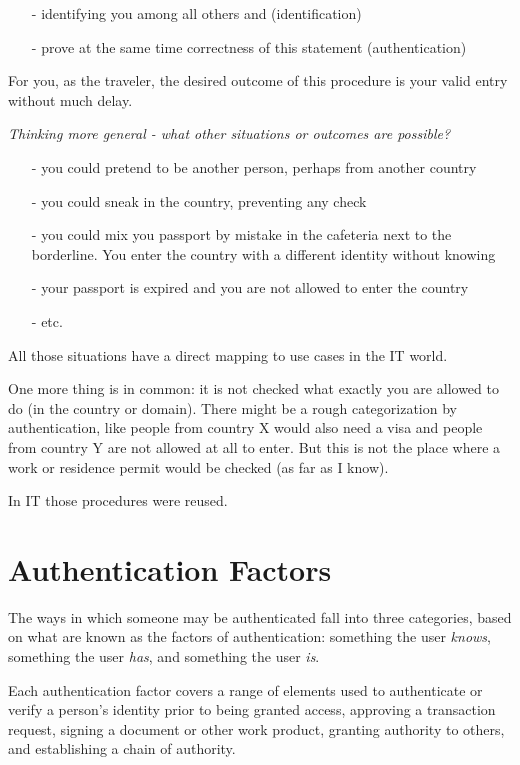 \begin{enumerate}
    \item[-] identifying you among all others and (identification)
    \item[-] prove at the same time correctness of this statement (authentication)
\end{enumerate}

For you, as the traveler, the desired outcome of this procedure is your valid entry without much delay.


\emph{Thinking more general - what other situations or outcomes are possible?}

\begin{itemize}
    \item[-] you could pretend to be another person, perhaps from another country
    \item[-] you could sneak in the country, preventing any check
    \item[-] you could mix you passport by mistake in the cafeteria next to the borderline. 
        You enter the country with a different identity without knowing
    \item[-] your passport is expired and you are not allowed to enter the country
    \item[-] etc.
\end{itemize}

All those situations have a direct mapping to use cases in the IT world.

One more thing is in common: it is not checked what exactly you are allowed to do (in the country or domain). There might be a rough categorization by authentication, like people from country X would also need a visa and people from country Y are not allowed at all to enter. But this is not the place where a work or residence permit would be checked (as far as I know).

In IT those procedures were reused.


\section{Authentication Factors}

The ways in which someone may be authenticated fall into three categories, based on what are known as the factors of authentication: something the user \emph{knows}, something the user \emph{has}, and something the user \emph{is}.

Each authentication factor covers a range of elements used to authenticate or verify a person's identity prior to being granted access, approving a transaction request, signing a document or other work product, granting authority to others, and establishing a chain of authority.

